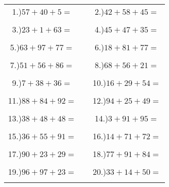 \documentclass{article}
\begin{document}
\begin{tabular}{ccc}
1.)$57+40+5=$& \hspace{5cm} &2.)$42+58+45=$\\\\
3.)$23+1+63=$& \hspace{5cm} &4.)$45+47+35=$\\\\
5.)$63+97+77=$& \hspace{5cm} &6.)$18+81+77=$\\\\
7.)$51+56+86=$& \hspace{5cm} &8.)$68+56+21=$\\\\
9.)$7+38+36=$& \hspace{5cm} &10.)$16+29+54=$\\\\
11.)$88+84+92=$& \hspace{5cm} &12.)$94+25+49=$\\\\
13.)$38+48+48=$& \hspace{5cm} &14.)$3+91+95=$\\\\
15.)$36+55+91=$& \hspace{5cm} &16.)$14+71+72=$\\\\
17.)$90+23+29=$& \hspace{5cm} &18.)$77+91+84=$\\\\
19.)$96+97+23=$& \hspace{5cm} &20.)$33+14+50=$\\\\
\end{tabular}
\newpage
\end{document}
